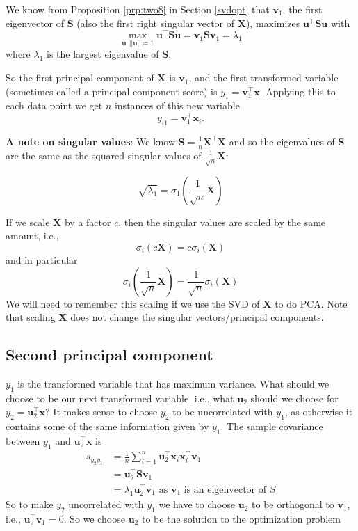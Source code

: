 \documentclass[]{book}
\theoremstyle{definition}
\theoremstyle{definition}
\theoremstyle{definition}
\theoremstyle{remark}
\begin{document}
We know from Proposition \ref{prp:two8} in Section \ref{svdopt} that \(\boldsymbol v_1\), the first eigenvector of \(\boldsymbol S\) (also the first right singular vector of \(\boldsymbol X\)), maximizes \(\boldsymbol u^\top \boldsymbol S\boldsymbol u\) with
\[  \max_{\boldsymbol u: ||\boldsymbol u||=1} \boldsymbol u^\top \boldsymbol S\boldsymbol u= \boldsymbol v_1 \boldsymbol S\boldsymbol v_1 =\lambda_1\]
where \(\lambda_1\) is the largest eigenvalue of \(\boldsymbol S\).

So the first principal component of \(\boldsymbol X\) is \(\boldsymbol v_1\), and the first transformed variable (sometimes called a principal component score) is \(y_1 = \boldsymbol v_1 ^\top \boldsymbol x\).
Applying this to each data point we get \(n\) instances of this new variable
\[y_{i1} = \boldsymbol v_1 ^\top \boldsymbol x_i.\]

\textbf{A note on singular values}: We know \(\boldsymbol S= \frac{1}{n}\boldsymbol X^\top\boldsymbol X\) and so the eigenvalues of \(\boldsymbol S\) are the same as the squared singular values of \(\frac{1}{\sqrt{n}} \boldsymbol X\):

\[\sqrt{\lambda_1} = \sigma_1\left(\frac{1}{\sqrt{n}} \boldsymbol X\right)\]

If we scale \(\boldsymbol X\) by a factor \(c\), then the singular values are scaled by the same amount, i.e.,
\[\sigma_i(c\boldsymbol X)=c\sigma_i(\boldsymbol X)\]
and in particular
\[ \sigma_i\left(\frac{1}{\sqrt{n}} \boldsymbol X\right) = \frac{1}{\sqrt{n}} \sigma_i(\boldsymbol X)\]
We will need to remember this scaling if we use the SVD of \(\boldsymbol X\) to do PCA. Note that scaling \(\boldsymbol X\) does not change the singular vectors/principal components.

\hypertarget{second-principal-component}{%
\subsection{Second principal component}\label{second-principal-component}}

\(y_1\) is the transformed variable that has maximum variance. What should we choose to be our next transformed variable, i.e., what \(\boldsymbol u_2\) should we choose for \(y_2 = \boldsymbol u_2^\top \boldsymbol x\)? It makes sense to choose \(y_2\) to be uncorrelated with \(y_1\), as otherwise it contains some of the same information given by \(y_1\). The sample covariance between \(y_1\) and \(\boldsymbol u_2^\top \boldsymbol x\) is
\begin{align*}
s_{y_2y_1} &=\frac{1}{n}\sum_{i=1}^n \boldsymbol u_2^\top \boldsymbol x_i \boldsymbol x_i^\top \boldsymbol v_1\\ 
&= \boldsymbol u_2^\top \boldsymbol S\boldsymbol v_1\\
& = \lambda_1 \boldsymbol u_2^\top \boldsymbol v_1 \mbox{ as } \boldsymbol v_1 \mbox{ is an eigenvector of } S
\end{align*}
So to make \(y_2\) uncorrelated with \(y_1\) we have to choose \(\boldsymbol u_2\) to be orthogonal to \(\boldsymbol v_1\), i.e., \(\boldsymbol u_2^\top \boldsymbol v_1=0\). So we choose \(\boldsymbol u_2\) to be the solution to the optimization problem
\end{document}
